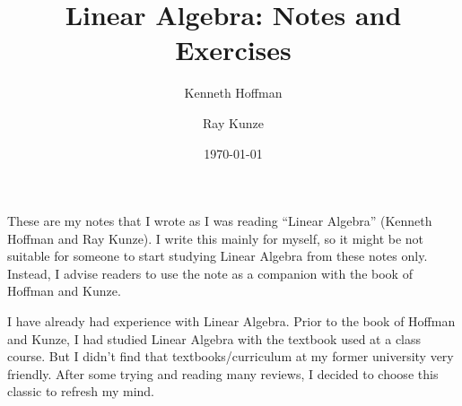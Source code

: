 \documentclass{linear-algebra}
\title{Linear Algebra: Notes and Exercises}
\author{Kenneth Hoffman\and Ray Kunze}
\date{\today}
\begin{document}
\maketitle

These are my notes that I wrote as I was reading ``Linear Algebra'' (Kenneth Hoffman and Ray Kunze). I write this mainly for myself, so it might be not suitable for someone to start studying Linear Algebra from these notes only. Instead, I advise readers to use the note as a companion with the book of Hoffman and Kunze.

I have already had experience with Linear Algebra. Prior to the book of Hoffman and Kunze, I had studied Linear Algebra with the textbook used at a class course. But I didn't find that textbooks/curriculum at my former university very friendly. After some trying and reading many reviews, I decided to choose this classic to refresh my mind.

\tableofcontents











\end{document}
